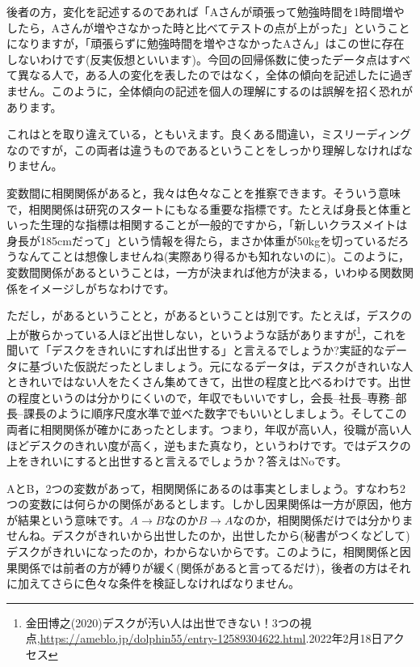 \documentclass{ltjbook}
\begin{document}
後者の方，変化を記述するのであれば「Aさんが頑張って勉強時間を1時間増やしたら，Aさんが増やさなかった時と比べてテストの点が上がった」ということになりますが，「頑張らずに勉強時間を増やさなかったAさん」はこの世に存在しないわけです(反実仮想といいます)。今回の回帰係数に使ったデータ点はすべて異なる人で，ある人の変化を表したのではなく，全体の傾向を記述したに過ぎません。このように，全体傾向の記述を個人の理解にするのは誤解を招く恐れがあります。

これはとを取り違えている，ともいえます。良くある間違い，ミスリーディングなのですが，この両者は違うものであるということをしっかり理解しなければなりません。

変数間に相関関係があると，我々は色々なことを推察できます。そういう意味で，相関関係は研究のスタートにもなる重要な指標です。たとえば身長と体重といった生理的な指標は相関することが一般的ですから，「新しいクラスメイトは身長が185cmだって」という情報を得たら，まさか体重が50kgを切っているだろうなんてことは想像しませんね(実際あり得るかも知れないのに)。このように，変数間関係があるということは，一方が決まれば他方が決まる，いわゆる関数関係をイメージしがちなわけです。

ただし，があるということと，があるということは別です。たとえば，デスクの上が散らかっている人ほど出世しない，というような話がありますが\footnote{金田博之(2020)デスクが汚い人は出世できない！3つの視点,\url{https://ameblo.jp/dolphin55/entry-12589304622.html}.2022年2月18日アクセス}，これを聞いて「デスクをきれいにすれば出世する」と言えるでしょうか?実証的なデータに基づいた仮説だったとしましょう。元になるデータは，デスクがきれいな人ときれいではない人をたくさん集めてきて，出世の程度と比べるわけです。出世の程度というのは分かりにくいので，年収でもいいですし，会長--社長--専務--部長--課長のように順序尺度水準で並べた数字でもいいとしましょう。そしてこの両者に相関関係が確かにあったとします。つまり，年収が高い人，役職が高い人ほどデスクのきれい度が高く，逆もまた真なり，というわけです。ではデスクの上をきれいにすると出世すると言えるでしょうか？答えはNoです。

AとB，2つの変数があって，相関関係にあるのは事実としましょう。すなわち2つの変数には何らかの関係があるとします。しかし因果関係は一方が原因，他方が結果という意味です。$A \to B$なのか$B \to A$なのか，相関関係だけでは分かりませんね。デスクがきれいから出世したのか，出世したから(秘書がつくなどして)デスクがきれいになったのか，わからないからです。このように，相関関係と因果関係では前者の方が縛りが緩く(関係があると言ってるだけ)，後者の方はそれに加えてさらに色々な条件を検証しなければなりません。
\end{document}
